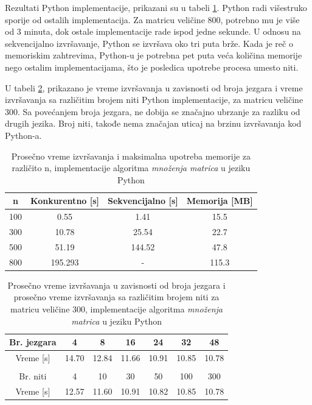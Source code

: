 \documentclass[12pt,oneside]{memoir}
\begin{document}
Rezultati Python implementacije, prikazani su u tabeli \ref{tab:matrix1}. Python radi višestruko sporije od ostalih implementacija. Za matricu veličine 800, potrebno mu je više od 3 minuta, dok ostale implementacije rade ispod jedne sekunde. U odnosu na sekvencijalno izvršavanje, Python se izvršava oko tri puta brže. Kada je reč o memoriskim zahtrevima, Python-u je potrebna pet puta veća količina memorije nego ostalim implementacijama, što je posledica upotrebe procesa umesto niti.

U  tabeli \ref{tab:matrix11}, prikazano je vreme izvršavanja u zavisnosti od broja jezgara i vreme izvršavanja sa različitim brojem niti Python implementacije, za matricu veličine 300. Sa povećanjem broja jezgara, ne dobija se značajno ubrzanje za razliku od drugih jezika. Broj niti, takođe nema značajan uticaj na brzinu izvršavanja kod Python-a.

\begin{table}
\begin{center}
\caption{Prosečno vreme izvršavanja i maksimalna upotreba memorije za različito n,  implementacije  algoritma \textit{množenja matrica}  u jeziku Python}
\begin{tabular}{||c||c|c|c||}
\hline
n & Konkurentno [s]& Sekvencijalno [s] & Memorija [MB] \\ \hline
100	&0.55		&1.41		&15.5\\
300	&10.78	&25.54	&22.7\\
500	&51.19	&144.52	&47.8\\
800	&195.293	&- 		&115.3\\
\hline
\end{tabular}
\label{tab:matrix1}
\end{center}
\end{table}

\begin{table}
\begin{center}
\caption{Prosečno vreme izvršavanja  u zavisnosti od broja jezgara i prosečno vreme izvršavanja sa različitim brojem niti za matricu veličine 300,  implementacije algoritma \textit{množenja matrica} u jeziku Python}
\begin{tabular}{||c||c|c|c|c|c|c||}
\hline
Br. jezgara &4  &8 &16 &24 & 32 &48 \\ \hline
Vreme [s]	&14.70	&12.84	&11.66 	& 10.91	&10.85	&10.78\\ \hline  
\multicolumn{7}{c}{}\\
\hline
Br. niti &4 &10 &30 &50 &100 & 300  \\ \hline
Vreme [s]	&12.57	&11.60	&10.91	 & 10.82	&10.85	&10.78\\ \hline
\end{tabular}
\label{tab:matrix11}
\end{center}
\end{table}
\end{document}
